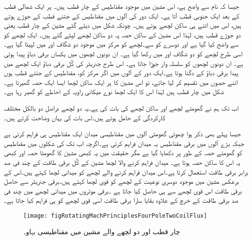  جیسا کہ نام سے واضح ہے، اس مشین میں موجود  مقناطیس کے چار قطب  ہیں۔ ہر ایک شمالی قطب کے بعد ایک جنوبی قطب آتا ہے۔ ایک دور کی آلوں میں مقناطیس کے جتنے  قطب کے جوڑے ہوتے ہیں، اس میں  اتنے ہی ساکن لچھے ہوتے ہیں۔ چونکہ شکل  میں دیئے گئے مشین کے چار قطب یعنی دو جوڑے قطب ہیں،  لہٰذا اس مشین کے ساکن حصہ پہ دو ساکن لچھے لپٹے  گئے ہیں۔ ایک لچھے کو  سے واضح کیا گیا ہے اور دوسرے کو  سے۔لچھے  کو  مرکز میں موجود دو شگاف  اور  میں لپیٹا گیا ہے۔ اسی طرح  لچھے کو دو شگاف  اور  میں رکھا گیا ہے۔ ان دونوں لچھوں میں یکساں برقی دباؤ پیدا ہوتی ہے۔ ان دونوں لچھوں کو سلسلہ وار جوڑا جاتا ہے۔ اس طرح جنریٹر کی کُل برقی دباؤ ایک لچھے میں پیدا  برقی دباؤ کے دگنا ہوتا ہے۔ایک دور کے آلوں میں  اگر مرکز کو، مقناطیس کے جتنے قطب ہوں اتنے حصوں میں تقسیم کر لیا جائے، تو اس مشین کا ہر ایک ساکن لچھا ایسا ایک حصہ گھیرتا ہے۔ شکل میں چار  قطب  ہیں  لہٰذا اس کا ایک لچھا  نوے میکانی زاویہ کے احاطے کو گھیر رہا ہے۔

اب تک ہم نے گھومتے لچھے اور ساکن لچھے کی بات کی ہے۔یہ دو لچھے دراصل دو بالکل مختلف کارکردگی کے حامل ہوتے ہیں۔اس بات کی  یہاں وضاحت کرتے ہیں۔

جیسا پہلے بھی ذکر ہوا چھوٹی گھومتی آلوں میں مقناطیسی میدان ایک مقناطیس ہی فراہم کرتی ہے جبکہ بڑے آلوں میں برقی مقناطیس یہ میدان فراہم کرتی ہے۔اگرچہ اب تک کی شکلوں میں مقناطیس کو گھومتے حصہ کے طور پر دکھایا گیا ہے مگر حقیقت میں یہ کبھی مشین کا گھومتا حصہ اور کبھی یہ اس کا ساکن حصہ ہوتا ہے۔ میدان فراہم کرنے والا لچھا مشین کے کُل برقی طاقت کے چند فی صد برابر برقی طاقت استعمال کرتا ہے۔اس  میدان فراہم کرنے والے لچھے کو میدانی لچھا  کہتے ہیں۔اس کے برعکس مشین میں موجود دوسری نوعیت کے لچھے کو قوی لچھا  کہتے ہیں۔برقی جنریٹر سے حاصل برقی طاقت اس قوی لچھے سے ہی حاصل کیا جاتا ہے ۔برقی موٹروں میں میدانی لچھے میں چند فی صد برقی طاقت کے خرچ کے علاوہ بقایا سارا برقی طاقت اسی قوی لچھے کو ہی فراہم کیا جاتا ہے۔
\begin{figure}
\centering
\texttt{[image: figRotatingMachPrinciplesFourPoleTwoCoilFlux]}
\caption{چار قطب اور دو لچھے والے مشین میں مقناطیسی بہاو۔}
\label{شکل_گھومتے_مشین_چار_قطب_کا_بہاو}
\end{figure}


